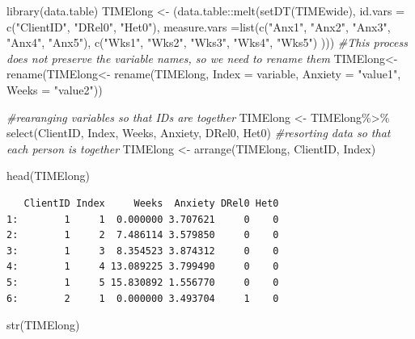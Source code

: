 \documentclass[
  11pt,
]{book}
\newenvironment{Shaded}{\begin{snugshade}}{\end{snugshade}}
\newcommand{\AttributeTok}[1]{\textcolor[rgb]{0.77,0.63,0.00}{#1}}
\newcommand{\CommentTok}[1]{\textcolor[rgb]{0.56,0.35,0.01}{\textit{#1}}}
\newcommand{\FunctionTok}[1]{\textcolor[rgb]{0.00,0.00,0.00}{#1}}
\newcommand{\NormalTok}[1]{#1}
\newcommand{\OtherTok}[1]{\textcolor[rgb]{0.56,0.35,0.01}{#1}}
\newcommand{\SpecialCharTok}[1]{\textcolor[rgb]{0.00,0.00,0.00}{#1}}
\newcommand{\StringTok}[1]{\textcolor[rgb]{0.31,0.60,0.02}{#1}}
\begin{document}
\begin{Shaded}
\begin{Highlighting}[]
\FunctionTok{library}\NormalTok{(data.table)}
\NormalTok{TIMElong }\OtherTok{\textless{}{-}}\NormalTok{ (data.table}\SpecialCharTok{::}\FunctionTok{melt}\NormalTok{(}\FunctionTok{setDT}\NormalTok{(TIMEwide), }\AttributeTok{id.vars =} \FunctionTok{c}\NormalTok{(}\StringTok{"ClientID"}\NormalTok{, }\StringTok{"DRel0"}\NormalTok{, }\StringTok{"Het0"}\NormalTok{), }\AttributeTok{measure.vars =}\FunctionTok{list}\NormalTok{(}\FunctionTok{c}\NormalTok{(}\StringTok{"Anx1"}\NormalTok{, }\StringTok{"Anx2"}\NormalTok{, }\StringTok{"Anx3"}\NormalTok{, }\StringTok{"Anx4"}\NormalTok{, }\StringTok{"Anx5"}\NormalTok{),  }\FunctionTok{c}\NormalTok{(}\StringTok{"Wks1"}\NormalTok{, }\StringTok{"Wks2"}\NormalTok{, }\StringTok{"Wks3"}\NormalTok{, }\StringTok{"Wks4"}\NormalTok{, }\StringTok{"Wks5"}\NormalTok{) )))}
\CommentTok{\#This process  does not preserve the variable names, so we need to rename them}
\NormalTok{TIMElong}\OtherTok{\textless{}{-}} \FunctionTok{rename}\NormalTok{(TIMElong}\OtherTok{\textless{}{-}}  \FunctionTok{rename}\NormalTok{(TIMElong, }\AttributeTok{Index =}\NormalTok{ variable, }\AttributeTok{Anxiety =} \StringTok{"value1"}\NormalTok{, }\AttributeTok{Weeks =} \StringTok{"value2"}\NormalTok{))}

\CommentTok{\#rearanging variables so that IDs are together}
\NormalTok{TIMElong }\OtherTok{\textless{}{-}}\NormalTok{ TIMElong}\SpecialCharTok{\%\textgreater{}\%}
  \FunctionTok{select}\NormalTok{(ClientID, Index, Weeks, Anxiety, DRel0, Het0)}
\CommentTok{\#resorting data so that each person is together}
\NormalTok{TIMElong }\OtherTok{\textless{}{-}} \FunctionTok{arrange}\NormalTok{(TIMElong, ClientID, Index)}

\FunctionTok{head}\NormalTok{(TIMElong)}
\end{Highlighting}
\end{Shaded}

\begin{verbatim}
   ClientID Index     Weeks  Anxiety DRel0 Het0
1:        1     1  0.000000 3.707621     0    0
2:        1     2  7.486114 3.579850     0    0
3:        1     3  8.354523 3.874312     0    0
4:        1     4 13.089225 3.799490     0    0
5:        1     5 15.830892 1.556770     0    0
6:        2     1  0.000000 3.493704     1    0
\end{verbatim}

\begin{Shaded}
\begin{Highlighting}[]
\FunctionTok{str}\NormalTok{(TIMElong)}
\end{Highlighting}
\end{Shaded}
\end{document}
